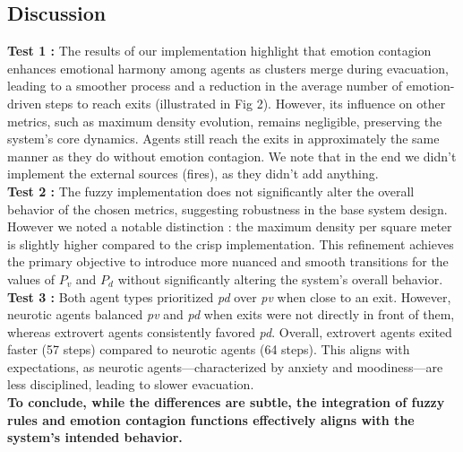 \documentclass[12pt]{article}
\begin{document}
\begin{spacing}{1.15}
\begin{multicols}{2}
\section{Discussion}
\textbf{Test 1 :} The results of our implementation highlight that emotion contagion enhances emotional harmony among agents as clusters merge during evacuation, leading to a smoother process and a reduction in the average number of emotion-driven steps to reach exits (illustrated in Fig 2). However, its influence on other metrics, such as maximum density evolution, remains negligible, preserving the system's core dynamics. Agents still reach the exits in approximately the same manner as they do without
emotion contagion. We note that in the end we didn't implement the external sources (fires), as they didn't add anything.\\
\noindent\textbf{Test 2 :} The fuzzy implementation does not significantly alter the overall behavior of the chosen metrics, suggesting robustness in the base system design. However we noted a notable distinction : the maximum density per square meter is slightly higher compared to the crisp implementation. This refinement achieves the  primary objective to introduce more nuanced and smooth transitions for the values of $P_v$ and $P_d$ without significantly altering the system's overall behavior.\\
\noindent \textbf{Test 3 :} Both agent types prioritized \textit{pd} over \textit{pv} when close to an exit. However, neurotic agents balanced \textit{pv} and \textit{pd} when exits were not directly in front of them, whereas extrovert agents consistently favored \textit{pd}. Overall, extrovert agents exited faster (57 steps) compared to neurotic agents (64 steps). This aligns with expectations, as neurotic agents—characterized by anxiety and moodiness—are less disciplined, leading to slower evacuation.\\

\noindent \textbf{To conclude, while the differences are subtle, the integration of fuzzy rules and emotion contagion functions effectively aligns with the system's intended behavior.}
\end{multicols}
\begin{spacing}{1.0} %
{\scriptsize
}
\end{spacing}


\end{spacing}
\end{document}
